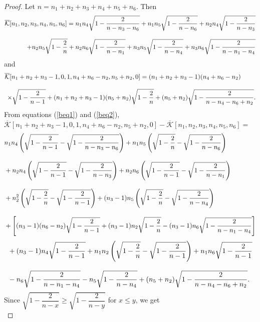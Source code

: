\documentclass[12pt]{article}
\begin{document}
\begin{proof}
Let $n=n_{1}+n_{2}+n_{3}+n_{4}+n_{5}+n_{6}$. Then
\begin{align}\label{beq1} \overline{\mathcal{K}}[n_{1},n_{2},n_{3},n_{4},n_{5},n_{6}]=n_{1}n_{4}\sqrt{1-\dfrac{2}{n-n_{3}-n_{6}}}+n_{1}n_{5}\sqrt{1-\dfrac{2}{n-n_{6}}}+n_{2}n_{4}\sqrt{1-\dfrac{2}{n-n_{3}}}\notag\\[3mm]+n_{2}n_{5}\sqrt{1-\dfrac{2}{n}}+n_{2}n_{6}\sqrt{1-\dfrac{2}{n-n_{1}}}+n_{3}n_{5}\sqrt{1-\dfrac{2}{n-n_{4}}}+n_{3}n_{6}\sqrt{1-\dfrac{2}{n-n_{1}-n_{4}}}
\end{align}
and 
\begin{align}\label{beq2} \overline{\mathcal{K}}[n_{1}+n_{2}+n_{3}-1,0,1,n_{4}+n_{6}-n_{2},n_{5}+n_{2},0]=(n_{1}+n_{2}+n_{3}-1)(n_{4}+n_{6}-n_{2})~~~~~~~\notag\\[3mm]\times\sqrt{1-\dfrac{2}{n-1}}+(n_{1}+n_{2}+n_{3}-1)(n_{5}+n_{2})\sqrt{1-\dfrac{2}{n}}+(n_{5}+n_{2})\sqrt{1-\dfrac{2}{n-n_{4}-n_{6}+n_{2}}}.
\end{align}
From equations (\ref{beq1}) and (\ref{beq2}),\\ $\overline{\mathcal{K}}[n_{1}+n_{2}+n_{3}-1,0,1,n_{4}+n_{6}-n_{2},n_{5}+n_{2},0]- \overline{\mathcal{K}}[n_{1},n_{2},n_{3},n_{4},n_{5},n_{6}]=$
\begin{align*}
&n_{1}n_{4}\left(\sqrt{1-\dfrac{2}{n-1}}-\sqrt{1-\dfrac{2}{n-n_{3}-n_{6}}}\right)+n_{1}n_{5}\left(\sqrt{1-\dfrac{2}{n}}-\sqrt{1-\dfrac{2}{n-n_{6}}}\right)\notag\\[3mm]&+n_{2}n_{4}\left(\sqrt{1-\dfrac{2}{n-1}}-\sqrt{1-\dfrac{2}{n-n_{3}}}\right)+n_{2}n_{6}\left(\sqrt{1-\dfrac{2}{n-1}}-\sqrt{1-\dfrac{2}{n-n_{1}}}\right)\notag\\[3mm]&+n^{2}_{2}\left(\sqrt{1-\dfrac{2}{n}}-\sqrt{1-\dfrac{2}{n-1}}\right)
+(n_{3}-1)n_{5}\left(\sqrt{1-\dfrac{2}{n}}-\sqrt{1-\dfrac{2}{n-n_{4}}}\right)\notag\\[3mm]&+\left[(n_{3}-1)(n_{6}-n_{2})\sqrt{1-\dfrac{2}{n-1}}+(n_{3}-1)n_{2}\sqrt{1-\dfrac{2}{n}}-(n_{3}-1)n_{6}\sqrt{1-\dfrac{2}{n-n_{1}-n_{4}}}\right]\end{align*}
\begin{align}&+(n_{3}-1)n_{4}\sqrt{1-\dfrac{2}{n-1}}+n_{1}n_{2}\left(\sqrt{1-\dfrac{2}{n}}-\sqrt{1-\dfrac{2}{n-1}}\right)+n_{1}n_{6}\sqrt{1-\dfrac{2}{n-1}}\notag\\[3mm]&-n_{6}\sqrt{1-\dfrac{2}{n-n_{1}-n_{4}}}-n_{5}\sqrt{1-\dfrac{2}{n-n_{4}}}+(n_5+n_{2})\sqrt{1-\dfrac{2}{n-n_{4}-n_{6}+n_{2}}}.\notag\end{align}
Since $\sqrt{1-\dfrac{2}{n-x}}\ge \sqrt{1-\dfrac{2}{n-y}}$ for $x\le y$, we get\\[3mm] 

\end{proof}
\end{document}
